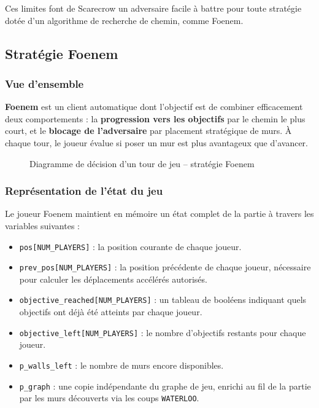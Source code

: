 \documentclass[12pt,a4paper]{article}
\begin{document}
\noindent Ces limites font de Scarecrow un adversaire facile à battre pour
toute stratégie dotée d'un algorithme de recherche de chemin, comme Foenem.
\subsection{Stratégie Foenem}

\subsubsection{Vue d'ensemble}

\textbf{Foenem} est un client automatique dont l'objectif est de 
combiner efficacement deux comportements : la \textbf{progression vers les objectifs} 
par le chemin le plus court, et le \textbf{blocage de l'adversaire} par placement 
stratégique de murs. À chaque tour, le joueur évalue si poser un mur est plus 
avantageux que d'avancer.

\begin{figure}[h]
\centering
\caption{Diagramme de décision d'un tour de jeu -- stratégie Foenem}
\end{figure}

\subsubsection{Représentation de l'état du jeu}

Le joueur Foenem maintient en mémoire un état complet de la partie à travers 
les variables suivantes :

\begin{itemize}
    \item \texttt{pos[NUM\_PLAYERS]} : la position courante de chaque joueur.
    \item \texttt{prev\_pos[NUM\_PLAYERS]} : la position précédente de chaque joueur, 
    nécessaire pour calculer les déplacements accélérés autorisés.
    \item \texttt{objective\_reached[NUM\_PLAYERS]} : un tableau de booléens indiquant 
    quels objectifs ont déjà été atteints par chaque joueur.
    \item \texttt{objective\_left[NUM\_PLAYERS]} : le nombre d'objectifs restants 
    pour chaque joueur.
    \item \texttt{p\_walls\_left} : le nombre de murs encore disponibles.
    \item \texttt{p\_graph} : une copie indépendante du graphe de jeu, enrichi au fil de la partie par 
    les murs découverts via les coups \texttt{WATERLOO}.
\end{itemize}
\end{document}
